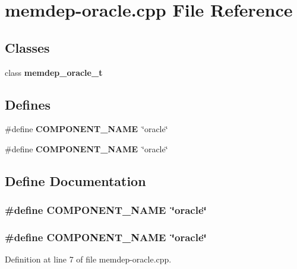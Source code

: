 \section{memdep-oracle.cpp File Reference}
\label{memdep-oracle_8cpp}
\subsection*{Classes}
\begin{CompactItemize}
\item 
class {\bf memdep\_\-oracle\_\-t}
\end{CompactItemize}
\subsection*{Defines}
\begin{CompactItemize}
\item 
\#define {\bf COMPONENT\_\-NAME}~\char`\"{}oracle\char`\"{}
\item 
\#define {\bf COMPONENT\_\-NAME}~\char`\"{}oracle\char`\"{}
\end{CompactItemize}


\subsection{Define Documentation}
\subsubsection[{COMPONENT\_\-NAME}]{\setlength{\rightskip}{0pt plus 5cm}\#define COMPONENT\_\-NAME~\char`\"{}oracle\char`\"{}}\label{zesto-memdep_8cpp_9146ade7ce24e3db226a973a59063892}


\subsubsection[{COMPONENT\_\-NAME}]{\setlength{\rightskip}{0pt plus 5cm}\#define COMPONENT\_\-NAME~\char`\"{}oracle\char`\"{}}\label{memdep-oracle_8cpp_9146ade7ce24e3db226a973a59063892}




Definition at line 7 of file memdep-oracle.cpp.